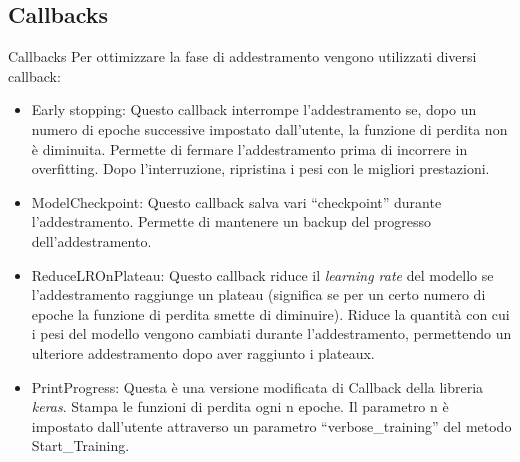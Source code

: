 \documentclass{beamer}
\begin{document}
\subsection{Callbacks}
\begin{frame}{Callbacks}
Per ottimizzare la fase di addestramento vengono utilizzati diversi callback:
\pause
    \begin{itemize}
        \item Early stopping:
			Questo callback interrompe l'addestramento se, dopo un numero di epoche successive impostato dall'utente, la funzione di perdita non è diminuita. Permette di fermare l'addestramento prima di incorrere in overfitting. Dopo l'interruzione, ripristina i pesi con le migliori prestazioni.
\pause        
\item ModelCheckpoint:
				Questo callback salva vari ``checkpoint'' durante l'addestramento. Permette di mantenere un backup del progresso dell'addestramento.
\pause        
\item ReduceLROnPlateau:
				Questo callback riduce il \emph{learning rate} del modello se l'addestramento raggiunge un plateau (significa se per un certo numero di epoche la funzione di perdita smette di diminuire). Riduce la quantità con cui i pesi del modello vengono cambiati durante l'addestramento, permettendo un ulteriore addestramento dopo aver raggiunto i plateaux.
\pause			
\item PrintProgress:
				Questa è una versione modificata di Callback della libreria \emph{keras}. Stampa le funzioni di perdita ogni n epoche. Il parametro n è impostato dall'utente attraverso un parametro ``verbose\_training'' del metodo Start\_Training.
    \end{itemize}
\end{frame}

\end{document}

